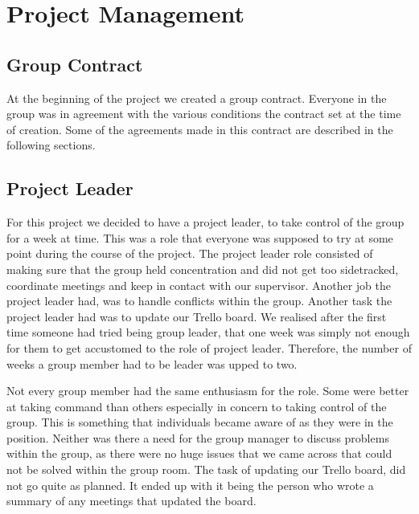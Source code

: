 \section{Project Management}
\subsection{Group Contract}
At the beginning of the project we created a group contract. 
Everyone in the group was in agreement with the various conditions the contract set at the time of creation. 
Some of the agreements made in this contract are described in the following sections.

\subsection{Project Leader}
For this project we decided to have a project leader, to take control of the group for a week at time. 
This was a role that everyone was supposed to try at some point during the course of the project. 
The project leader role consisted of making sure that the group held concentration and did not get too sidetracked, coordinate meetings and keep in contact with our supervisor. 
Another job the project leader had, was to handle conflicts within the group. 
Another task the project leader had was to update our Trello board.
We realised after the first time someone had tried being group leader, that one week was simply not enough for them to get accustomed to the role of project leader.
Therefore, the number of weeks a group member had to be leader was upped to two.

Not every group member had the same enthusiasm for the role. 
Some were better at taking command than others especially in concern to taking control of the group.
This is something that individuals became aware of as they were in the position.
Neither was there a need for the group manager to discuss problems within the group, as there were no huge issues that we came across that could not be solved within the group room.
The task of updating our Trello board, did not go quite as planned. 
It ended up with it being the person who wrote a summary of any meetings that updated the board.

